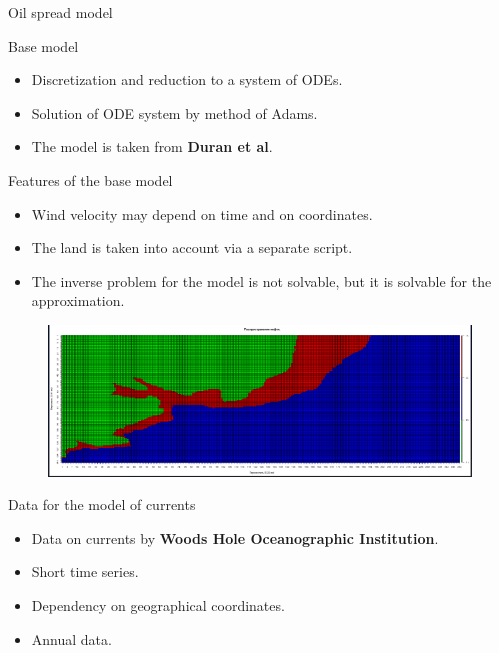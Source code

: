 \documentclass{beamer}
\begin{document}
\begin{section}{Oil spread model}
\begin{frame}{Base model}
\begin{itemize}
	\item Discretization and reduction to a system of ODEs.
	
	\item Solution of ODE system by method of Adams.
	
	\item The model is taken from \textbf{Duran et al}.
	
\end{itemize}
\end{frame}

\begin{frame}{Features of the base model}
\begin{itemize}
	\item Wind velocity may depend on time and on coordinates.
	\item The land is taken into account via a separate script.
	\item The inverse problem for the model is not solvable, but it is solvable for the approximation. 
\end{itemize}

\begin{figure}[H]
	\centering
	\includegraphics[scale=0.2]{photo_after.png}
\end{figure}
\end{frame}

\begin{frame}{Data for the model of currents}
\begin{itemize}
	\item Data on currents by \textbf{Woods Hole Oceanographic Institution}.
	\item Short time series.
	\item Dependency on geographical coordinates.
	\item Annual data.
\end{itemize}


\end{frame}
\end{section}
\end{document}
